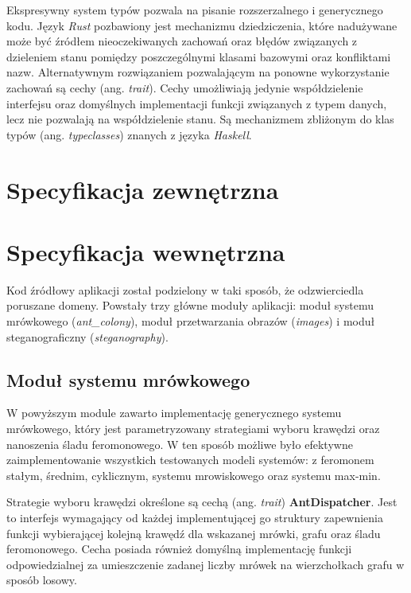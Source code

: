 {    Ekspresywny system typów pozwala na pisanie rozszerzalnego i generycznego kodu. Język \textit{Rust} pozbawiony jest
    mechanizmu dziedziczenia, które nadużywane może być źródłem nieoczekiwanych zachowań oraz błędów związanych z
    dzieleniem stanu pomiędzy poszczególnymi klasami bazowymi oraz konfliktami nazw. Alternatywnym rozwiązaniem
    pozwalającym na ponowne wykorzystanie zachowań są cechy (ang. \textit{trait}). Cechy umożliwiają jedynie
    współdzielenie interfejsu oraz domyślnych implementacji funkcji związanych z typem danych, lecz nie pozwalają na
    współdzielenie stanu. Są mechanizmem zbliżonym do klas typów (ang. \textit{typeclasses}) znanych z języka
    \textit{Haskell}.


    \section{Specyfikacja zewnętrzna}
    {

    }

    \section{Specyfikacja wewnętrzna}
    {
        Kod źródłowy aplikacji został podzielony w taki sposób, że odzwierciedla poruszane domeny. Powstały trzy główne
        moduły aplikacji: moduł systemu mrówkowego (\textit{ant\_colony}), moduł przetwarzania obrazów (\textit{images})
        i moduł steganograficzny (\textit{steganography}).


        \subsection{Moduł systemu mrówkowego}
        {
            W powyższym module zawarto implementację generycznego systemu mrówkowego, który jest parametryzowany
            strategiami wyboru krawędzi oraz nanoszenia śladu feromonowego. W ten sposób możliwe było efektywne
            zaimplementowanie wszystkich testowanych modeli systemów: z feromonem stałym, średnim, cyklicznym, systemu
            mrowiskowego oraz systemu max-min.

            Strategie wyboru krawędzi określone są cechą (ang. \textit{trait}) \textbf{AntDispatcher}. Jest to interfejs
            wymagający od każdej implementującej go struktury zapewnienia funkcji wybierającej kolejną krawędź dla
            wskazanej mrówki, grafu oraz śladu feromonowego. Cecha posiada również domyślną implementację funkcji
            odpowiedzialnej za umieszczenie zadanej liczby mrówek na wierzchołkach grafu w sposób losowy.

}}}
